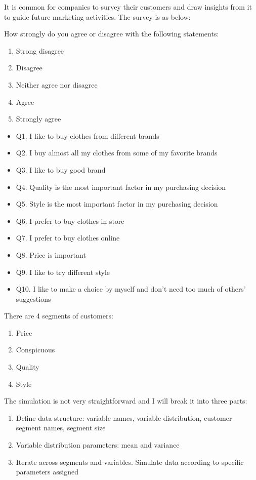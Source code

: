 \documentclass[]{book}
\providecommand{\tightlist}{%
  \setlength{\itemsep}{0pt}\setlength{\parskip}{0pt}}
\theoremstyle{definition}
\theoremstyle{definition}
\theoremstyle{remark}
\begin{document}
It is common for companies to survey their customers and draw insights
from it to guide future marketing activities. The survey is as below:

How strongly do you agree or disagree with the following statements:

\begin{enumerate}
\def\labelenumi{\arabic{enumi}.}
\tightlist
\item
  Strong disagree
\item
  Disagree
\item
  Neither agree nor disagree
\item
  Agree
\item
  Strongly agree
\end{enumerate}

\begin{itemize}
\tightlist
\item
  Q1. I like to buy clothes from different brands
\item
  Q2. I buy almost all my clothes from some of my favorite brands
\item
  Q3. I like to buy good brand
\item
  Q4. Quality is the most important factor in my purchasing decision
\item
  Q5. Style is the most important factor in my purchasing decision
\item
  Q6. I prefer to buy clothes in store
\item
  Q7. I prefer to buy clothes online
\item
  Q8. Price is important
\item
  Q9. I like to try different style
\item
  Q10. I like to make a choice by myself and don't need too much of
  others' suggestions
\end{itemize}

There are 4 segments of customers:

\begin{enumerate}
\def\labelenumi{\arabic{enumi}.}
\tightlist
\item
  Price
\item
  Conspicuous
\item
  Quality
\item
  Style
\end{enumerate}

The simulation is not very straightforward and I will break it into
three parts:

\begin{enumerate}
\def\labelenumi{\arabic{enumi}.}
\tightlist
\item
  Define data structure: variable names, variable distribution, customer
  segment names, segment size
\item
  Variable distribution parameters: mean and variance
\item
  Iterate across segments and variables. Simulate data according to
  specific parameters assigned
\end{enumerate}
\end{document}
